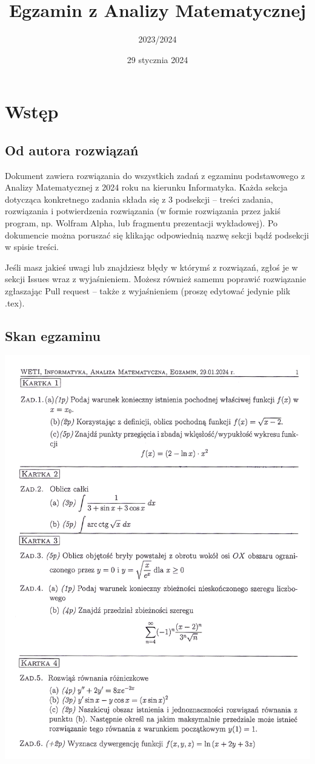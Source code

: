 \documentclass[12pt]{article}
\title{Egzamin z Analizy Matematycznej}
\author{2023/2024}
\date{29 stycznia 2024}
\begin{document}
\maketitle 
\tableofcontents

\section{Wstęp} \label{wstep}
\subsection{Od autora rozwiązań} 
Dokument zawiera rozwiązania do wszystkich zadań z egzaminu podstawowego z Analizy Matematycznej z 2024 roku na kierunku Informatyka. Każda sekcja dotycząca konkretnego zadania składa się z 3 podsekcji -- treści zadania, rozwiązania i potwierdzenia rozwiązania (w formie rozwiązania przez jakiś program, np. Wolfram Alpha, lub fragmentu prezentacji wykładowej). Po dokumencie można poruszać się klikając odpowiednią nazwę sekcji bądź podsekcji w spisie treści.

Jeśli masz jakieś uwagi lub znajdziesz błędy w którymś z rozwiązań, zgłoś je w sekcji Issues wraz z wyjaśnieniem. Możesz również samemu poprawić rozwiązanie zgłaszając Pull request -- także z wyjaśnieniem (proszę edytować jedynie plik .tex).
\subsection{Skan egzaminu}
\includegraphics{am24.png}
\end{document}
